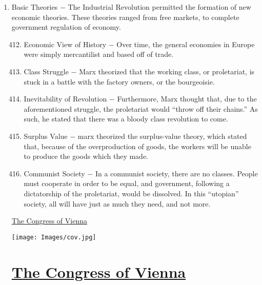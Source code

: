 \documentclass[12pt]{article}
\begin{document}
\begin{enumerate}
\item Basic Theories $-$ The Industrial Revolution permitted the formation of new economic theories. These theories ranged from free markets, to complete government regulation of economy.

\begin{enumerate}[label=\arabic{*}.]
\setcounter{enumii}{411}

\item Economic View of History $-$ Over time, the general economies in Europe were simply mercantilist and based off of trade. 

\item Class Struggle $-$ Marx theorized that the working class, or proletariat, is stuck in a battle with the factory owners, or the bourgeoisie. 

\item Inevitability of Revolution $-$ Furthermore, Marx thought that, due to the aforementioned struggle, the proletariat would ``throw off their chains.'' As such, he stated that there was a bloody class revolution to come.

\item Surplus Value $-$ marx theorized the surplus-value theory, which stated that, because of the overproduction of goods, the workers will be unable to produce the goods which they made.

\item Communist Society $-$ In a communist society, there are no classes. People must cooperate in order to be equal, and government, following a dictatorship of the proletariat, would be dissolved. In this ``utopian'' society, all will have just as much they need, and not more.

\end{enumerate}
\setcounter{enumi}{416}

\newpage
\begin{center}
\end{center}
\begin{center}
\end{center}
\begin{center}
\underline{\Huge The Congress of Vienna}
\end{center}
\vspace{50pt}
\texttt{[image: Images/cov.jpg]}
\newpage

\section{\underline{The Congress of Vienna}}


\end{enumerate}
\end{document}
